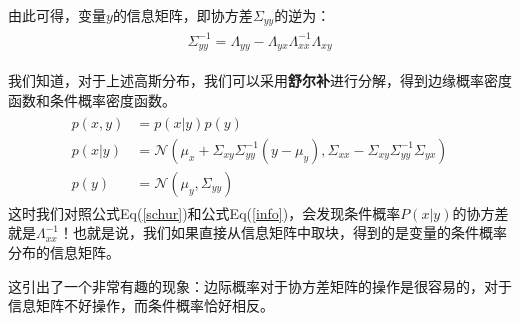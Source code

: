 \documentclass[a4pape,oneside,10pt]{article}
\begin{document}
由此可得，变量$y$的信息矩阵，即协方差$\Sigma_{yy}$的逆为：
\begin{equation}
    \label{info}
    \begin{split}
        \begin{aligned}
    \Sigma_{yy}^{-1} = \textbf{$\varLambda_{yy} - \varLambda_{yx}\varLambda_{xx}^{-1}\varLambda_{xy}$}
\end{aligned}
\end{split}
\end{equation}

我们知道，对于上述高斯分布，我们可以采用\textbf{舒尔补}进行分解，得到边缘概率密度函数和条件概率密度函数。
\begin{equation}
\label{schur}
\begin{split}
\begin{aligned}
    p(x,y) &= p(x|y)p(y) \\
    p(x|y) &= \mathcal{N}(\mu_x + \Sigma_{xy}\Sigma_{yy}^{-1}(y-\mu_y), \Sigma_{xx} - \Sigma_{xy}\Sigma_{yy}^{-1}\Sigma_{yx}) \\
    p(y) &= \mathcal{N} (\mu_y, \Sigma_{yy})
\end{aligned}
\end{split}
\end{equation}
这时我们对照公式Eq(\ref{schur})和公式Eq(\ref{info})，会发现条件概率$P(x|y)$的协方差就是$\varLambda_{xx}^{-1}$！也就是说，我们如果直接从信息矩阵中取块，得到的是变量的条件概率分布的信息矩阵\cite{pa}。

这引出了一个非常有趣的现象：边际概率对于协方差矩阵的操作是很容易的，对于信息矩阵不好操作，而条件概率恰好相反。
\end{document}
